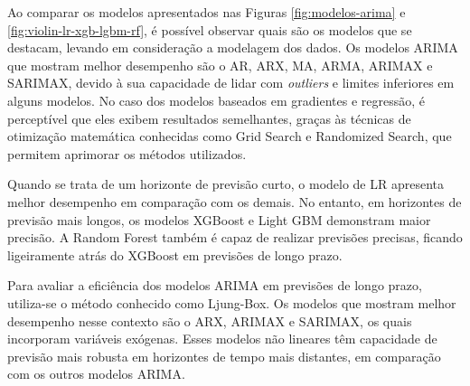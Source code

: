 Ao comparar os modelos apresentados nas Figuras \ref{fig:modelos-arima} e \ref{fig:violin-lr-xgb-lgbm-rf}, é possível observar quais são os modelos que se destacam, levando em consideração a modelagem dos dados. Os modelos ARIMA que mostram melhor desempenho são o AR, ARX, MA, ARMA, ARIMAX e SARIMAX, devido à sua capacidade de lidar com \textit{outliers} e limites inferiores em alguns modelos. No caso dos modelos baseados em gradientes e regressão, é perceptível que eles exibem resultados semelhantes, graças às técnicas de otimização matemática conhecidas como Grid Search e Randomized Search, que permitem aprimorar os métodos utilizados.

Quando se trata de um horizonte de previsão curto, o modelo de LR apresenta melhor desempenho em comparação com os demais. No entanto, em horizontes de previsão mais longos, os modelos XGBoost e Light GBM demonstram maior precisão. A Random Forest também é capaz de realizar previsões precisas, ficando ligeiramente atrás do XGBoost em previsões de longo prazo.

Para avaliar a eficiência dos modelos ARIMA em previsões de longo prazo, utiliza-se o método conhecido como Ljung-Box. Os modelos que mostram melhor desempenho nesse contexto são o ARX, ARIMAX e SARIMAX, os quais incorporam variáveis exógenas. Esses modelos não lineares têm capacidade de previsão mais robusta em horizontes de tempo mais distantes, em comparação com os outros modelos ARIMA.
